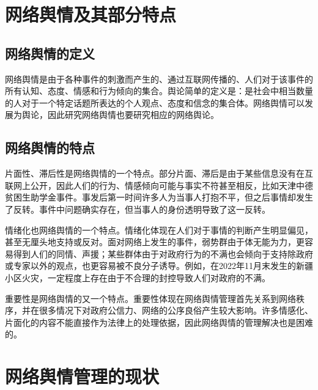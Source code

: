 	\chapter{网络舆情及其部分特点}
	
	
	\section{网络舆情的定义}
	网络舆情是由于各种事件的刺激而产生的、通过互联网传播的、人们对于该事件的所有认知、态度、情感和行为倾向的集合。舆论简单的定义是：是社会中相当数量的人对于一个特定话题所表达的个人观点、态度和信念的集合体。网络舆情可以发展为舆论，因此研究网络舆情也要研究相应的网络舆论。\par
	\section{网络舆情的特点}
	片面性、滞后性是网络舆情的一个特点。部分片面、滞后是由于某些信息没有在互联网上公开，因此人们的行为、情感倾向可能与事实不符甚至相反，比如天津中德贫困生助学金事件。事发后第一时间许多人为当事人打抱不平，但之后事情却发生了反转。事件中问题确实存在，但当事人的身份透明导致了这一反转。\par
	情绪化也网络舆情的一个特点。情绪化体现在人们对于事情的判断产生明显偏见，甚至无厘头地支持或反对。面对网络上发生的事件，弱势群由于体无能为力，更容易得到人们的同情、声援；某些群体由于对政府行为的不满也会倾向于支持除政府或专家以外的观点，也更容易被不良分子诱导。例如，在2022年11月末发生的新疆小区火灾，一定程度上存在由于不合理的封控导致人们对政府的不满。\par
	重要性是网络舆情的又一个特点。重要性体现在网络舆情管理首先关系到网络秩序，并在很多情况下对政府公信力、网络的公序良俗产生较大影响。许多情感化、片面化的内容不能直接作为法律上的处理依据，因此网络舆情的管理解决也是困难的。\par
	
	\chapter{网络舆情管理的现状}
	
